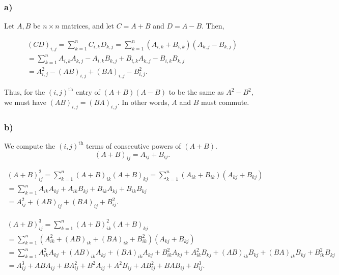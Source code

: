 \documentclass{article}
\begin{document}
\subsubsection*{a)}

Let $A,B$ be $n\times n$ matrices, and let $C=A+B$ and $D=A-B$. Then,

\begin{gather*}
(CD)_{i,j} = \sum_{k=1}^n C_{i,k} D_{k,j} = \sum_{k=1}^n (A_{i,k} + B_{i,k}) (A_{k,j} - B_{k,j}) \\
= \sum_{k=1}^n A_{i,k} A_{k,j} - A_{i,k} B_{k,j} + B_{i,k} A_{k,j} - B_{i,k}B_{k,j} \\
= A^2_{i,j} - (AB)_{i,j} + (BA)_{i,j} - B^2_{i,j}.
\end{gather*}

Thus, for the $(i,j)^{\text{th}}$ entry of $(A+B)(A-B)$ to be the same as $A^2 - B^2$, we must have $(AB)_{i,j} = (BA)_{i,j}$. In other words, $A$ and $B$ must commute.

\subsubsection*{b)}

We compute the $(i,j)^{\text{th}}$ terms of consecutive powers of $(A+B)$.\\

$$
(A+B)_{ij}=A_{ij}+B_{ij}.
$$

\begin{gather*}
    (A+B)^2_{ij} = \sum_{k=1}^n (A+B)_{ik} (A+B)_{kj} = \sum_{k=1}^n (A_{ik} + B_{ik}) (A_{kj} + B_{kj}) \\
    = \sum_{k=1}^n A_{ik}A_{kj} + A_{ik}B_{kj} + B_{ik}A_{kj} + B_{ik}B_{kj} \\
    = A^2_{ij} + (AB)_{ij} + (BA)_{ij} + B^2_{ij}.
\end{gather*}

\begin{gather*}
    (A+B)^3_{ij} = \sum_{k=1}^n (A+B)^2_{ik} (A+B)_{kj}\\
    = \sum_{k=1}^n (A^2_{ik} + (AB)_{ik} + (BA)_{ik} + B^2_{ik})(A_{kj} + B_{kj}) \\
    = \sum_{k=1}^n A^2_{ik}A_{kj} + (AB)_{ik}A_{kj} + (BA)_{ik}A_{kj} + B^2_{ik}A_{kj} + A^2_{ik}B_{kj} + (AB)_{ik}B_{kj} + (BA)_{ik}B_{kj} + B^2_{ik}B_{kj} \\
    = A^3_{ij} + ABA_{ij} + BA^2_{ij} + B^2A_{ij} + A^2B_{ij} + AB^2_{ij} + BAB_{ij} + B^3_{ij}.
\end{gather*}\\
\end{document}
